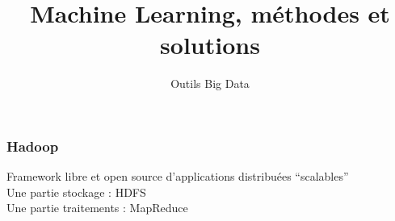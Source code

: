 \documentclass{formation}
\title{Machine Learning, méthodes et solutions}
\subtitle{Outils Big Data}
\begin{document}
\maketitle

\begin{frame}
  \frametitle{Hadoop}
  Framework libre et open source d'applications distribuées ``scalables'' \\
  Une partie stockage : HDFS \\
  Une partie traitements : MapReduce
\end{frame}
\end{document}
